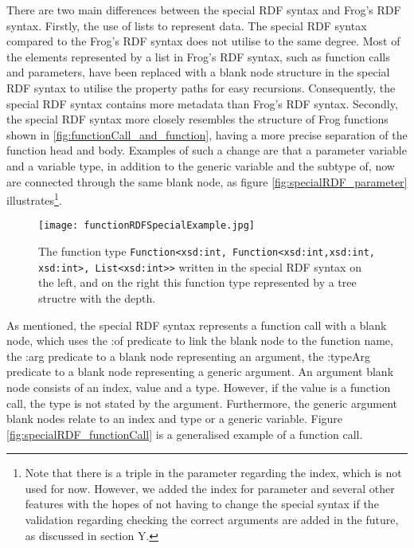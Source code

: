 \para
There are two main differences between the special RDF syntax and Frog's RDF syntax. Firstly, the use of lists to represent data. The special RDF syntax compared to the Frog's RDF syntax does not utilise to the same degree. Most of the elements represented by a list in Frog's RDF syntax, such as function calls and parameters, have been replaced with a blank node structure in the special RDF syntax to utilise the property paths for easy recursions. Consequently, the special RDF syntax contains more metadata than Frog's RDF syntax. Secondly, the special RDF syntax more closely resembles the structure of Frog functions shown in \ref{fig:functionCall_and_function}, having a more precise separation of the function head and body. Examples of such a change are that a parameter variable and a variable type, in addition to the generic variable and the subtype of, now are connected through the same blank node, as figure \ref{fig:specialRDF_parameter} illustrates\footnote{Note that there is a triple in the parameter regarding the index, which is not used for now. However, we added the index for parameter and several other features with the hopes of not having to change the special syntax if the validation regarding checking the correct arguments are added in the future, as discussed in section Y.}.

\begin{figure}
  \centering
  \begin{minipage}{.5\textwidth}
    \centering
    
  \end{minipage}%
  \begin{minipage}{.5\textwidth}
    \centering
    \texttt{[image: functionRDFSpecialExample.jpg]}
  \end{minipage}
  \label{fig:specialRDFSyntax example}
  \caption[Function type in the special RDF synta]{The function type \lstinline{Function<xsd:int, Function<xsd:int,xsd:int, xsd:int>, List<xsd:int>>} written in the special RDF syntax on the left, and on the right this function type represented by a tree structre with the depth. }
\end{figure}

\para
As mentioned, the special RDF syntax represents a function call with a blank node, which uses the :of predicate to link the blank node to the function name, the :arg predicate to a blank node representing an argument, the :typeArg predicate to a blank node representing a generic argument. An argument blank node consists of an index, value and a type. However, if the value is a function call, the type is not stated by the argument. Furthermore, the generic argument blank nodes relate to an index and type or a generic variable. Figure \ref{fig:specialRDF_functionCall} is a generalised example of a function call. 

